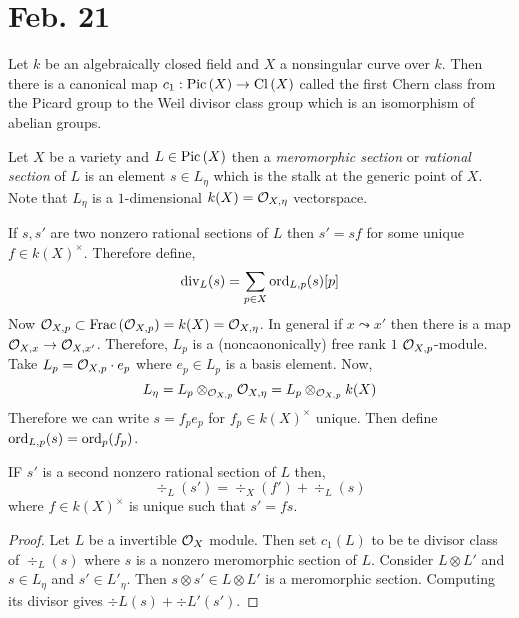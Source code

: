 \documentclass[12pt]{article}
\begin{document}
\section{Feb. 21}

\begin{theorem}
Let $k$ be an algebraically closed field and $X$ a nonsingular curve over $k$. Then there is a canonical map $c_1 : \mathrm{Pic} \left( X \right) \to \mathrm{Cl} \left( X \right)$ called the first Chern class from the Picard group to the Weil divisor class group which is an isomorphism of abelian groups. 
\end{theorem}

\begin{definition}
Let $X$ be a variety and $L \in \mathrm{Pic} \left( X \right)$ then a \textit{meromorphic section} or \textit{rational section} of $L$ is an element $s \in L_\eta$ which is the stalk at the generic point of $X$. Note that $L_\eta$ is a $1$-dimensional $k(X) = \mathcal{O}_{X, \eta}$ vectorspace. 
\end{definition}



\begin{definition}
If $s, s'$ are two nonzero rational sections of $L$ then $s' = s f$ for some unique $f \in k(X)^\times$. Therefore define,
\[ \mathrm{div}_L(s) = \sum_{p \in X} \operatorname{\mathrm{ord}}_{L, p}(s) [p] \]
Now $\mathcal{O}_{X, p} \subset \mathrm{Frac}\left(\mathcal{O}_{X, p}\right) = k(X) = \mathcal{O}_{X, \eta}$. In general if $x \leadsto x'$ then there is a map $\mathcal{O}_{X, x} \to \mathcal{O}_{X, x'}$. Therefore, $L_p$ is a (noncaononically) free rank $1$ $\mathcal{O}_{X, p}$-module. Take $L_p = \mathcal{O}_{X, p} \cdot e_p$ where $e_p \in L_p$ is a basis element. Now, 
\[ L_\eta = L_p \otimes_{\mathcal{O}_{X, p}} \mathcal{O}_{X, \eta} = L_p \otimes_{\mathcal{O}_{X, p}} k(X) \]
Therefore we can write $s = f_p e_p$ for $f_p \in k(X)^\times$ unique. Then define $\operatorname{\mathrm{ord}}_{L,p}(s) = \operatorname{\mathrm{ord}}_p(f_p)$. 
\end{definition}

\begin{lemma}
IF $s'$ is a second nonzero rational section of $L$ then,
\[ \div_L(s') = \div_X(f') + \div_L(s) \]
where $f \in k(X)^\times$ is unique such that $s' = f s$. 
\end{lemma}

\begin{proof}
Let $L$ be a invertible $\mathcal{O}_{X}$ module. Then set $c_1(L)$ to be te divisor class of $\div_L(s)$ where $s$ is a nonzero meromorphic section of $L$. Consider $L \otimes L'$ and $s \in L_\eta$ and $s' \in L'_{\eta}$. Then $s \otimes s' \in L \otimes L'$ is a meromorphic section. Computing its divisor gives $\div{L}(s) + \div{L'}(s')$. 
\end{proof}
\end{document}
